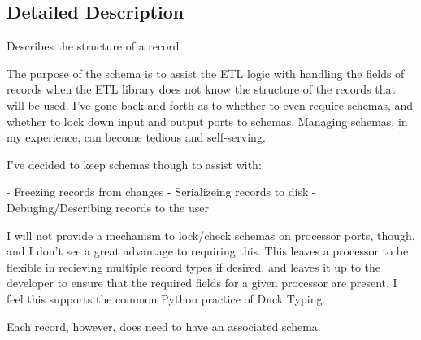 \subsection{Detailed Description}
\begin{DoxyVerb}Describes the structure of a record

The purpose of the schema is to assist the ETL logic with handling the
fields of records when the ETL library does not know the structure
of the records that will be used.  I've gone back and forth as to
whether to even require schemas, and whether to lock down input and
output ports to schemas.  Managing schemas, in my experience, can become
tedious and self-serving.

I've decided to keep schemas though to assist with:

    - Freezing records from changes
    - Serializeing records to disk
    - Debuging/Describing records to the user

I will not provide a mechanism to lock/check schemas on processor ports,
though, and I don't see a great advantage to requiring this.  This leaves
a processor to be flexible in recieving multiple record types if desired,
and leaves it up to the developer to ensure that the required fields for a
given processor are present.  I feel this supports the common Python
practice of Duck Typing.

Each record, however, does need to have an associated schema.
\end{DoxyVerb}
 

